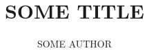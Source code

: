 \documentclass{beamer}
\title[short version]{SOME TITLE}
\author[SOME AUTHOR]{SOME AUTHOR}
\institute[SOME INSTITUTE]{SOME INSTITUE}
\begin{document}
\frame{\titlepage}
\begin{frame}[t]

\end{frame}
\end{document}
